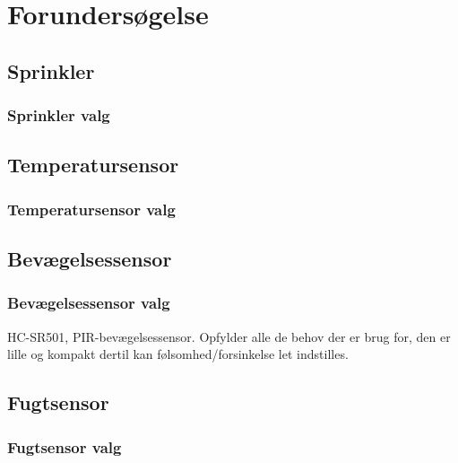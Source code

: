 \chapter{Forundersøgelse}

\section{Sprinkler}								%

\subsection{Sprinkler valg}						%

\section{Temperatursensor}						

\subsection{Temperatursensor valg}				%

\section{Bevægelsessensor}						

\subsection{Bevægelsessensor valg}				%
HC-SR501, PIR-bevægelsessensor. Opfylder alle de behov der er brug for, den er lille og kompakt dertil kan følsomhed/forsinkelse let indstilles.

\section{Fugtsensor}						

\subsection{Fugtsensor valg}						%
